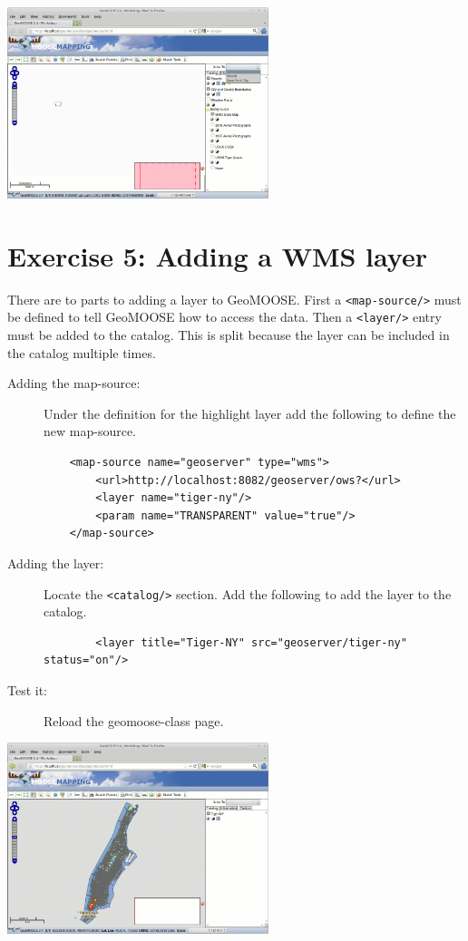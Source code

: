 \documentclass[letterpaper]{article}
\begin{document}
\begin{center}
  \includegraphics[width=3in]{images/04-results.png}
\end{center}

\section*{Exercise 5: Adding a WMS layer}
There are to parts to adding a layer to GeoMOOSE.  First a
\verb|<map-source/>| must be defined to tell GeoMOOSE how to access
the data.  Then a \verb|<layer/>| entry must be added to the catalog.
This is split because the layer can be included in the catalog
multiple times.

\begin{description}
\item[Adding the map-source:] Under the definition for the highlight
  layer add the following to define the new map-source.

\begin{verbatim}
	<map-source name="geoserver" type="wms">
		<url>http://localhost:8082/geoserver/ows?</url>
		<layer name="tiger-ny"/>
		<param name="TRANSPARENT" value="true"/>
	</map-source>
\end{verbatim}

\item[Adding the layer:] Locate the \verb|<catalog/>| section.  Add
  the following to add the layer to the catalog.
\begin{verbatim}
		<layer title="Tiger-NY" src="geoserver/tiger-ny" status="on"/>
\end{verbatim}

\item[Test it:] Reload the geomoose-class page.
\end{description}

\begin{center}
  \includegraphics[width=3in]{images/05-results.png}
\end{center}
\end{document}
